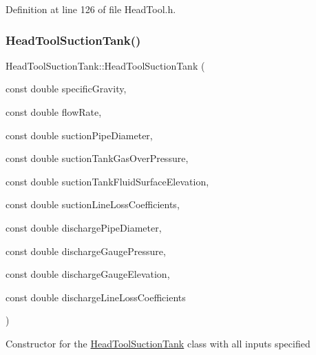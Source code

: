 Definition at line 126 of file Head\+Tool.\+h.

\mbox{\label{class_head_tool_suction_tank_a96579ecd414c723362db00cfeb24cd46}} 
\subsubsection{\texorpdfstring{Head\+Tool\+Suction\+Tank()}{HeadToolSuctionTank()}\hspace{0.1cm}{\footnotesize\ttfamily [2/3]}}
{\footnotesize\ttfamily Head\+Tool\+Suction\+Tank\+::\+Head\+Tool\+Suction\+Tank (\begin{DoxyParamCaption}\item[{const double}]{specific\+Gravity,  }\item[{const double}]{flow\+Rate,  }\item[{const double}]{suction\+Pipe\+Diameter,  }\item[{const double}]{suction\+Tank\+Gas\+Over\+Pressure,  }\item[{const double}]{suction\+Tank\+Fluid\+Surface\+Elevation,  }\item[{const double}]{suction\+Line\+Loss\+Coefficients,  }\item[{const double}]{discharge\+Pipe\+Diameter,  }\item[{const double}]{discharge\+Gauge\+Pressure,  }\item[{const double}]{discharge\+Gauge\+Elevation,  }\item[{const double}]{discharge\+Line\+Loss\+Coefficients }\end{DoxyParamCaption})\hspace{0.3cm}{\ttfamily [inline]}}

Constructor for the \hyperlink{class_head_tool_suction_tank}{Head\+Tool\+Suction\+Tank} class with all inputs specified


